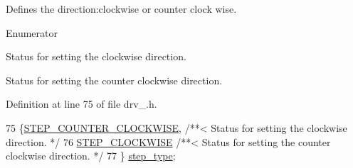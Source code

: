 Defines the direction\-:clockwise or counter clock wise. \begin{Desc}
\item[Enumerator]\par
\begin{description}
\item[{\em 
\hypertarget{group__biba__drv_gga3af682b92aa259509aea217f6dc64356a05e804aea3cc6dd53f5d5a836d0365c9}{S\-T\-E\-P\-\_\-\-C\-O\-U\-N\-T\-E\-R\-\_\-\-C\-L\-O\-C\-K\-W\-I\-S\-E}\label{group__biba__drv_gga3af682b92aa259509aea217f6dc64356a05e804aea3cc6dd53f5d5a836d0365c9}
}]Status for setting the clockwise direction. \item[{\em 
\hypertarget{group__biba__drv_gga3af682b92aa259509aea217f6dc64356aafe6025725d6001f0b0a973f1e719cc4}{S\-T\-E\-P\-\_\-\-C\-L\-O\-C\-K\-W\-I\-S\-E}\label{group__biba__drv_gga3af682b92aa259509aea217f6dc64356aafe6025725d6001f0b0a973f1e719cc4}
}]Status for setting the counter clockwise direction. \end{description}
\end{Desc}


Definition at line 75 of file drv\-\_.\-h.


\begin{DoxyCode}
75              \{\hyperlink{group__biba__drv_gga3af682b92aa259509aea217f6dc64356a05e804aea3cc6dd53f5d5a836d0365c9}{STEP\_COUNTER\_CLOCKWISE},   \textcolor{comment}{/**< Status for setting the clockwise
       direction. */}
76         \hyperlink{group__biba__drv_gga3af682b92aa259509aea217f6dc64356aafe6025725d6001f0b0a973f1e719cc4}{STEP\_CLOCKWISE}                  \textcolor{comment}{/**< Status for setting the counter clockwise
       direction. */}
77         \} \hyperlink{group__biba__drv_ga3af682b92aa259509aea217f6dc64356}{step\_type};
\end{DoxyCode}


